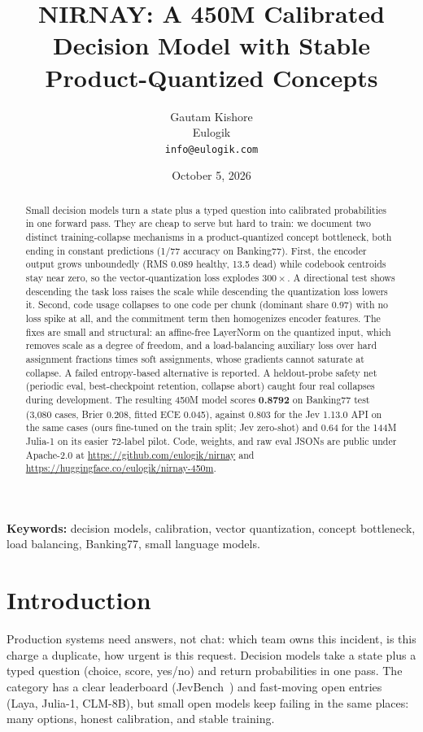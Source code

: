 \documentclass[11pt]{article}
\title{NIRNAY: A 450M Calibrated Decision Model with Stable Product-Quantized Concepts}
\author{Gautam Kishore \\ {\small Eulogik} \\ {\small \texttt{info@eulogik.com}}}
\date{October 5, 2026}
\begin{document}
\maketitle

\begin{abstract}
Small decision models turn a state plus a typed question into calibrated
probabilities in one forward pass. They are cheap to serve but hard to
train: we document two distinct training-collapse mechanisms in a
product-quantized concept bottleneck, both ending in constant predictions
(1/77 accuracy on Banking77). First, the encoder output grows unboundedly
(RMS 0.089 healthy, 13.5 dead) while codebook centroids stay near zero, so
the vector-quantization loss explodes $300\times$. A directional test shows
descending the task loss raises the scale while descending the
quantization loss lowers it. Second, code usage collapses to one code per
chunk (dominant share 0.97) with no loss spike at all, and the commitment
term then homogenizes encoder features. The fixes are small and structural:
an affine-free LayerNorm on the quantized input, which removes scale as a
degree of freedom, and a load-balancing auxiliary loss over hard
assignment fractions times soft assignments, whose gradients cannot
saturate at collapse. A failed entropy-based alternative is reported. A
heldout-probe safety net (periodic eval, best-checkpoint retention,
collapse abort) caught four real collapses during development. The
resulting 450M model scores \textbf{0.8792} on Banking77 test (3,080
cases, Brier 0.208, fitted ECE 0.045), against 0.803 for the Jev 1.13.0 API
on the same cases (ours fine-tuned on the train split; Jev zero-shot)
and 0.64 for the 144M Julia-1 on its easier 72-label
pilot. Code, weights, and raw eval JSONs are public under Apache-2.0
at \url{https://github.com/eulogik/nirnay} and
\url{https://huggingface.co/eulogik/nirnay-450m}.
\end{abstract}

\noindent\textbf{Keywords:} decision models, calibration, vector quantization,
concept bottleneck, load balancing, Banking77, small language models.

\section{Introduction}

Production systems need answers, not chat: which team owns this incident,
is this charge a duplicate, how urgent is this request. Decision models
take a state plus a typed question (choice, score, yes/no) and return
probabilities in one pass. The category has a clear leaderboard
(JevBench~\cite{jevbench}) and fast-moving open entries (Laya, Julia-1,
CLM-8B), but small open models keep failing in the same places: many
options, honest calibration, and stable training.
\end{document}
